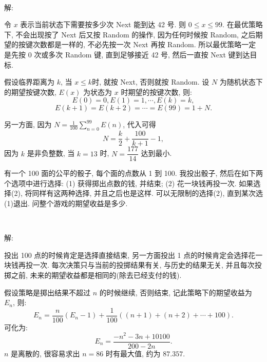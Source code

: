 ~

\noindent 解:

令 $x$ 表示当前状态下需要按多少次 Next 能到达 42 号. 则 $ 0\le x\le 99$. 在最优策略下, 不会出现按了 Next 后又按 Random 的操作, 因为任何时候按 Random, 之后期望的按键次数都是一样的, 不必先按一次 Next 再按 Random. 所以最优策略一定是先按 0 次或多次 Random 键, 直到足够接近 42 号, 然后一直按 Next 键到达目标.

假设临界距离为 $k$, 当 $x\le k$时, 就按 Next, 否则就按 Random. 设 $N$ 为随机状态下的期望按键次数, $E(x)$ 为状态为 $x$ 时期望的按键次数, 则:
\[E(0) = 0, E(1) = 1, \cdots, E(k) = k,\]
\[E(k+1) = E(k+2) = \cdots = E(99) = 1 + N .\]

另一方面, 因为 $\displaystyle N = \frac{1}{100}\sum_{n=0}^{99}{E(n)}$, 代入可得
\[ N = \frac{k}{2} + \frac{100}{k+1} - 1, \]
因为 $k$ 是非负整数, 当 $k=13$ 时, $N=\dfrac{177}{14}$ 达到最小.

\newpage

有一个 100 面的公平的骰子, 每个面的点数从 1 到 100. 我投出骰子, 然后在如下两个选项中进行选择: (1) 获得掷出点数的钱, 并结束; (2) 花一块钱再投一次. 如果选择(2), 将同样有这两种选择, 并且之后也是这样. 可以无限制的选择(2), 直到某次选(1)退出. 问整个游戏的期望收益是多少.

~

\noindent 解: 

投出 100 点的时候肯定是选择直接结束, 另一方面投出 1 点的时候肯定会选择花一块钱再投一次. 每次决策只与当前的投掷结果有关, 与历史的结果无关, 并且每次投掷之前, 未来的期望收益都是相同的(除去已经支付的钱).

假设策略是掷出结果不超过 $n$ 的时候继续, 否则结束, 记此策略下的期望收益为 $E_n$, 则:
\[ E_n = \frac{n}{100}(E_n - 1) + \frac{1}{100}((n+1) + (n+2) + \cdots + 100) .\]
可化为:
\[E_n = \frac{-n^2 - 3n + 10100}{200 - 2n}.\]
$n$ 是离散的, 很容易求出 $n = 86$ 时有最大值, 约为 $87.357$.


\newpage

